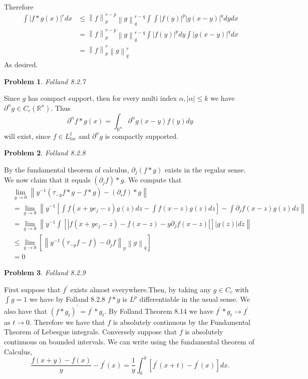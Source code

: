 \documentclass[12pt, a4paper]{article}
\newtheorem{problem}{Problem}
\theoremstyle{definition}
\newcommand{\R}{\mathbb{R}}                           %
\newcommand{\abs}[1]{\left| #1 \right|}
\newcommand{\norm}[1]{\left\lVert#1\right\rVert}
\begin{document}
Therefore 
\begin{align*}
\int |f\ast g(x)|^r dx  & \leq \norm{f}_p^{r-p} \norm{g}_{q}^{r-q} \int \int |f(y)|^p |g(x-y)|^q dy dx \\ & =\norm{f}_p^{r-p} \norm{g}_{q}^{r-q} \int|f(y)|^p dy \int|g(x-y)|^q dx \tag{by Fubini-Tonelli} 
\\ & = \norm{f}_{p}^r \norm{g}^r_{q} 
\end{align*}
As desired. 
\newpage
\begin{problem}
	Folland 8.2.7
\end{problem}
Since $g$ has compact support, then for every multi index $\alpha, |\alpha|\leq k$ we have $\partial^\alpha g\in C_c(\R^n)$. Thus $$\partial^\alpha f\ast g(x) = \int_{\R^n} \partial^\alpha g(x-y) f(y) dy$$ will exist, since $f\in L^1_{loc}$ and $\partial^\alpha g$ is compactly supported. 
\newpage
\begin{problem}
	Folland 8.2.8
\end{problem}
By the fundamental theorem of calculus, $\partial_j(f\ast g)$ exists in the regular sense. We now claim that it equals $(\partial_j f)\ast g$. 
We compute that 
\begin{align*}
	&\lim_{y\to 0} \norm{y^{-1}\left(\tau_{-y}f\ast g  - f\ast g\right) - (\partial_i f) \ast g }
	\\ &=  \lim_{y\to 0 } \norm{y^{-1} \left[ \int f(x+y e_j - z) g(z) dz - \int f(x-z)g(z)dz \right] - \int \partial_j f(x-z)g(z)dz }
	\\ & = \lim_{y\to 0} \norm{y^{-1} \int \left[\abs{f(x+ye_j -z) -f(x-z) - y \partial_j f(x-z) }\right] \abs{g(z) }dz } 
	\\ & \leq \lim_{y\to 0} \left[ \norm{y^{-1} (\tau_{-y}f - f) - \partial_j f}_p \norm{g}_{q}  \right] \tag{By Holders Inequality}
	\\ & = 0\tag{since $f$ is strong $L^p$ differentiable}
\end{align*}
\newpage 
\begin{problem}
	Folland 8.2.9
\end{problem}
First suppose that $f^\prime$ exists almost everywhere.Then, by taking any $g\in C_c$ with $\int g = 1$ we have by Folland 8.2.8 $f\ast g$ is $L^p$ differentiable in the usual sense. We also have that $(f\ast g_t)^\prime = f^\prime \ast g_t$. By Folland Theorem 8.14 we have $f^\prime \ast g_t\to f^\prime $ as $t\to 0$. Therefore we have that $f$ is absolutely continuous by the Fundamental Theorem of Lebesgue integrals. Conversely suppose that $f$ is absolutely continuous on bounded intervals. We can write using the fundamental theorem of Calculus, $$\frac{f(x+y)-f(x)}{y} - f^\prime(x)= \frac{1}{y} \int_0^y \left[f^\prime(x+t) - f^\prime(x)\right] dx .$$ 
\end{document}
